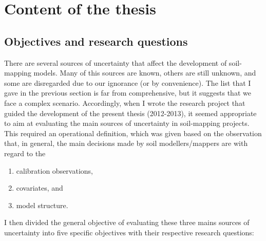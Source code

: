 \section{Content of the thesis}
\label{sec:thesis-content}

\subsection{Objectives and research questions}
\label{sec:thesis-objectives}

There are several sources of uncertainty that affect the development of soil-mapping models. Many 
of this sources are known, others are still unknown, and some are disregarded due to our ignorance
(or by convenience). The list that I gave in the previous section is far from comprehensive, but it 
suggests that we face a complex scenario. Accordingly, when I wrote the research project that
guided the development of the present thesis (2012-2013), it seemed appropriate to aim at evaluating 
the main sources of uncertainty in soil-mapping projects. This required an operational definition, 
which was given based on the observation that, in general, the main decisions made by soil 
modellers/mappers are with regard to the

\begin{enumerate}[label=(\alph*)]
\item calibration observations,
\item covariates, and
\item model structure.
\end{enumerate}

I then divided the general objective of evaluating these three mains sources of uncertainty into five 
specific objectives with their respective research questions:

